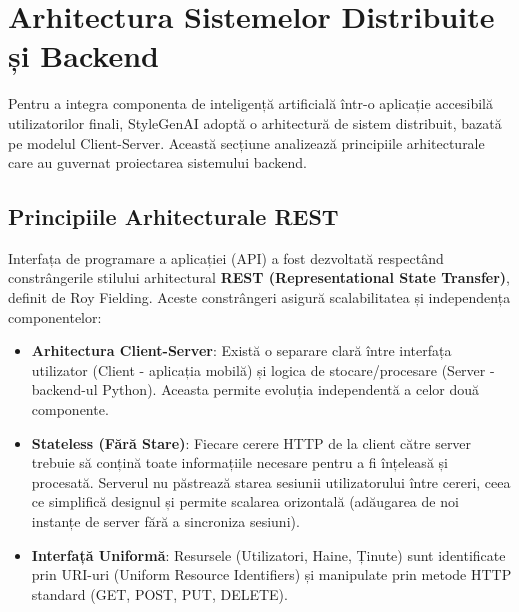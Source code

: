 \section{Arhitectura Sistemelor Distribuite și Backend}

Pentru a integra componenta de inteligență artificială într-o aplicație accesibilă utilizatorilor finali, StyleGenAI adoptă o arhitectură de sistem distribuit, bazată pe modelul Client-Server. Această secțiune analizează principiile arhitecturale care au guvernat proiectarea sistemului backend.

\subsection{Principiile Arhitecturale REST}
Interfața de programare a aplicației (API) a fost dezvoltată respectând constrângerile stilului arhitectural \textbf{REST (Representational State Transfer)}, definit de Roy Fielding. Aceste constrângeri asigură scalabilitatea și independența componentelor:

\begin{itemize}
    \item \textbf{Arhitectura Client-Server}: Există o separare clară între interfața utilizator (Client - aplicația mobilă) și logica de stocare/procesare (Server - backend-ul Python). Aceasta permite evoluția independentă a celor două componente.
    \item \textbf{Stateless (Fără Stare)}: Fiecare cerere HTTP de la client către server trebuie să conțină toate informațiile necesare pentru a fi înțeleasă și procesată. Serverul nu păstrează starea sesiunii utilizatorului între cereri, ceea ce simplifică designul și permite scalarea orizontală (adăugarea de noi instanțe de server fără a sincroniza sesiuni).
    \item \textbf{Interfață Uniformă}: Resursele (Utilizatori, Haine, Ținute) sunt identificate prin URI-uri (Uniform Resource Identifiers) și manipulate prin metode HTTP standard (GET, POST, PUT, DELETE).
\end{itemize}

